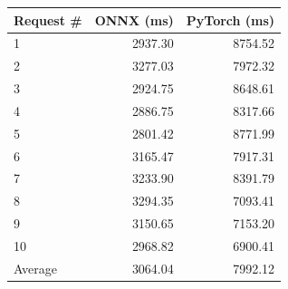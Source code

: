 \begin{tabular}{lrr}
\toprule
Request \# & ONNX (ms) & PyTorch (ms) \\
\midrule
1 & 2937.30 & 8754.52 \\
2 & 3277.03 & 7972.32 \\
3 & 2924.75 & 8648.61 \\
4 & 2886.75 & 8317.66 \\
5 & 2801.42 & 8771.99 \\
6 & 3165.47 & 7917.31 \\
7 & 3233.90 & 8391.79 \\
8 & 3294.35 & 7093.41 \\
9 & 3150.65 & 7153.20 \\
10 & 2968.82 & 6900.41 \\
Average & 3064.04 & 7992.12 \\
\bottomrule
\end{tabular}
